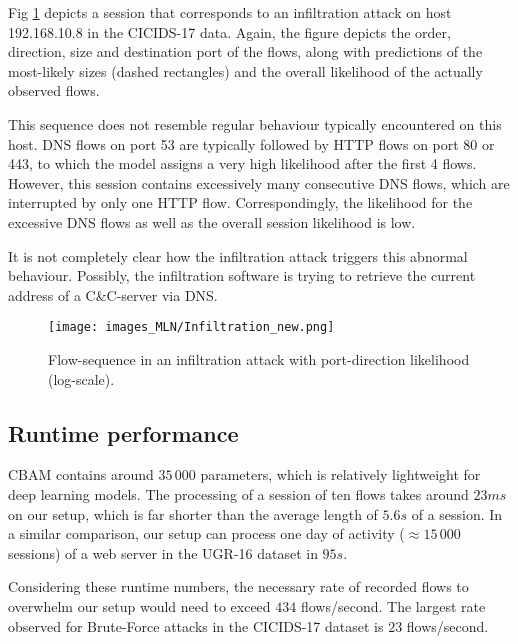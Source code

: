 Fig \ref{fig:Infiltration} depicts a session that corresponds to an infiltration attack on host 192.168.10.8 in the CICIDS-17 data. Again, the figure depicts the order, direction, size and destination port of the flows, along with predictions of the most-likely sizes (dashed rectangles) and the overall likelihood of the actually observed flows.

This sequence does not resemble regular behaviour typically encountered on this host. DNS flows on port 53 are typically followed by HTTP flows on port 80 or 443, to which the model assigns a very high likelihood after the first 4 flows. However, this session contains excessively many consecutive DNS flows, which are interrupted by only one HTTP flow. Correspondingly, the likelihood for the excessive DNS flows as well as the overall session likelihood is low. 

It is not completely clear how the infiltration attack triggers this abnormal behaviour. Possibly, the infiltration software is trying to retrieve the current address of a C\&C-server via DNS.

\begin{figure}[ht]
    \begin{center}
      \texttt{[image: images\_MLN/Infiltration\_new.png]}
    \end{center}

    \caption{Flow-sequence in an infiltration attack with port-direction likelihood (log-scale).}\label{fig:Infiltration}
\end{figure}

\subsection{Runtime performance}

CBAM contains around $35\,000$ parameters, which is relatively lightweight for deep learning models. The processing of a session of ten flows takes around $23ms$ on our setup, which is far shorter than the average length of $5.6s$ of a session. In a similar comparison, our setup can process one day of activity ($\approx 15\,000$ sessions) of a web server in the UGR-16 dataset in $95s$.

Considering these runtime numbers, the necessary rate of recorded flows to overwhelm our setup would need to exceed $434$ flows/second. The largest rate observed for Brute-Force attacks in the CICIDS-17 dataset is $23$ flows/second. 





